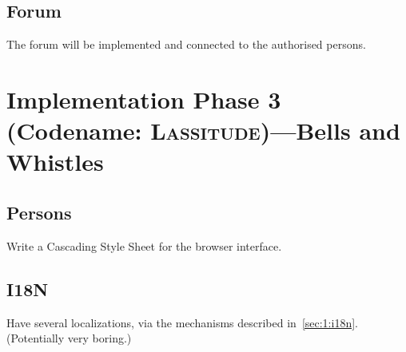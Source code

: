 \documentclass[a4paper]{article}
\begin{document}
 \subsection{Forum}\label{sec:2:forum}
 The forum will be implemented and connected to the authorised persons.
  \section{Implementation Phase 3 (Codename: \textsc{Lassitude})---Bells and Whistles}
  \subsection{Persons }\label{sec:3:persons}
  Write a Cascading Style Sheet for the browser interface.
  \subsection{I18N}
  Have several localizations, via the mechanisms described
  in~\ref{sec:1:i18n}. (Potentially very boring.)
 
\end{document}
